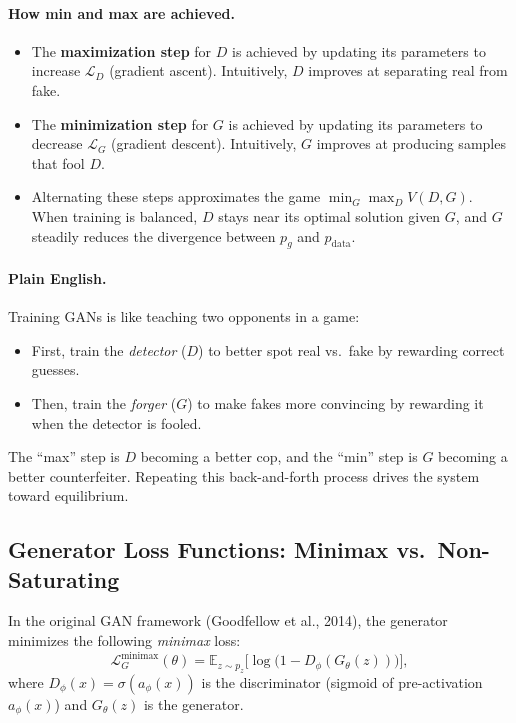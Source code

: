 \documentclass[11pt]{article}
\theoremstyle{remark}
\begin{document}
\paragraph{How min and max are achieved.}
\begin{itemize}
    \item The \textbf{maximization step} for $D$ is achieved by updating its parameters to increase $\mathcal{L}_D$ (gradient ascent). Intuitively, $D$ improves at separating real from fake.
    \item The \textbf{minimization step} for $G$ is achieved by updating its parameters to decrease $\mathcal{L}_G$ (gradient descent). Intuitively, $G$ improves at producing samples that fool $D$.
    \item Alternating these steps approximates the game $\min_G \max_D V(D,G)$. When training is balanced, $D$ stays near its optimal solution given $G$, and $G$ steadily reduces the divergence between $p_g$ and $p_{\text{data}}$.
\end{itemize}

\paragraph{Plain English.}
Training GANs is like teaching two opponents in a game:
\begin{itemize}
    \item First, train the \emph{detector} ($D$) to better spot real vs.\ fake by rewarding correct guesses.
    \item Then, train the \emph{forger} ($G$) to make fakes more convincing by rewarding it when the detector is fooled.
\end{itemize}
The ``max'' step is $D$ becoming a better cop, and the ``min'' step is $G$ becoming a better counterfeiter. Repeating this back-and-forth process drives the system toward equilibrium.

\subsection{Generator Loss Functions: Minimax vs.~Non-Saturating}

In the original GAN framework (Goodfellow et al., 2014), the generator
minimizes the following \emph{minimax} loss:
\begin{equation}
\label{eq:minimax}
\mathcal{L}^{\text{minimax}}_G(\theta)
= \mathbb{E}_{z\sim p_z}\Big[\log\!\big(1-D_\phi(G_\theta(z))\big)\Big],
\end{equation}
where $D_\phi(x)=\sigma(a_\phi(x))$ is the discriminator (sigmoid of pre-activation $a_\phi(x)$)
and $G_\theta(z)$ is the generator.
\end{document}
